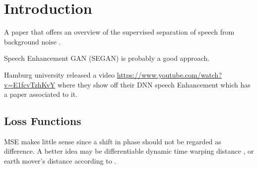\section{Introduction}

A paper that offers an overview of the supervised separation of speech from background noise \parencite{2017-speech-seperation-overview}.



Speech Enhancement GAN (SEGAN) \parencite{2017-SEGAN} is probably a good approach.

Hamburg university released a video
\hyperlink{https://www.youtube.com/watch?v=E1fcvTzhKvY}{https://www.youtube.com/watch?v=E1fcvTzhKvY}
where they show off their DNN speech Enhancement
which has a paper \parencite{2019-Noise-reduction-hamburg} associated to it.


\subsection{Loss Functions}

MSE makes little sense since a shift in phase should not be regarded as difference. A better idea may be 
differentiable dynamic time warping distance \parencite{2017-wasserstein-gan}, or earth mover's distance 
\parencite{2017-loss-function-for-time-series} according to \textcite{2019-deep-learning-audio-processing}.




